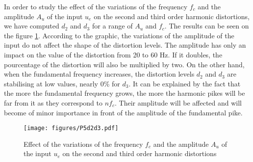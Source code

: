 In order to study the effect of the variations of the frequency $f_c$ and the amplitude $A_u$ of the input $u_e$ on the second and third order harmonic distortions, we have computed $d_2$ and $d_3$ for a range of $A_u$ and $f_c$. The results can be seen on the figure \ref{fig:d2d3}. According to the graphic, the variations of the amplitude of the input do not affect the shape of the distortion levels. The amplitude has only an impact on the value of the distortion from 20 to 60 Hz. If it doubles, the pourcentage of the distortion will also be multiplied by two. On the other hand, when the fundamental frequency increases, the distortion levels $d_2$ and $d_3$ are stabilising at low values, nearly 0\% for $d_3$. It can be explained by the fact that the more the fundamental frequency grows, the more the harmonic pikes will be far from it as they correspond to $nf_c$. Their amplitude will be affected and will become of minor importance in front of the amplitude of the fundamental pike.

\begin{figure}[H]
 \centering 
 \texttt{[image: figures/P5d2d3.pdf]}
 \caption{Effect of the variations of the frequency $f_c$ and the amplitude $A_u$ of the input $u_e$ on the second and third order harmonic distortions}
 \label{fig:d2d3}
\end{figure}